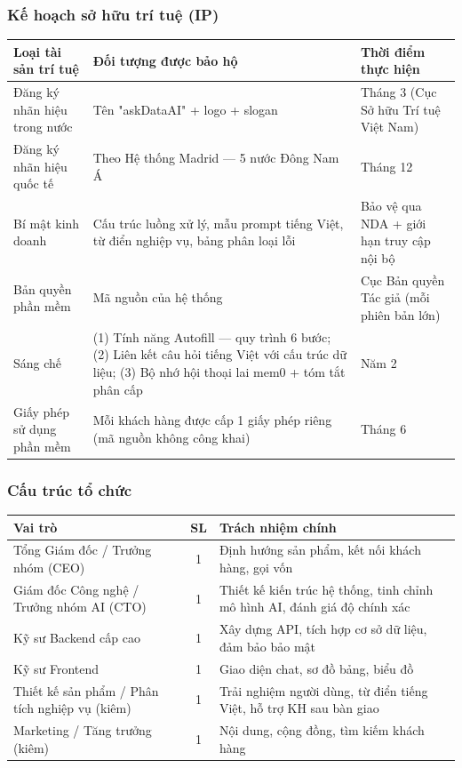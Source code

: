 \documentclass[11pt,a4paper]{article}
\begin{document}
\subsubsection{Kế hoạch sở hữu trí tuệ (IP)}

\begin{longtable}{|L{4cm}|L{6.5cm}|L{3.8cm}|}
\hline
{}\textbf{Loại tài sản trí tuệ} & \textbf{Đối tượng được bảo hộ} & \textbf{Thời điểm thực hiện} \\
\hline\endhead

Đăng ký nhãn hiệu trong nước & Tên "askDataAI" + logo + slogan & Tháng 3 (Cục Sở hữu Trí tuệ Việt Nam) \\ \hline
Đăng ký nhãn hiệu quốc tế & Theo Hệ thống Madrid --- 5 nước Đông Nam Á & Tháng 12 \\ \hline
Bí mật kinh doanh & Cấu trúc luồng xử lý, mẫu prompt tiếng Việt, từ điển nghiệp vụ, bảng phân loại lỗi & Bảo vệ qua NDA + giới hạn truy cập nội bộ \\ \hline
Bản quyền phần mềm & Mã nguồn của hệ thống & Cục Bản quyền Tác giả (mỗi phiên bản lớn) \\ \hline
Sáng chế & (1) Tính năng Autofill --- quy trình 6 bước; (2) Liên kết câu hỏi tiếng Việt với cấu trúc dữ liệu; (3) Bộ nhớ hội thoại lai mem0 + tóm tắt phân cấp & Năm 2 \\ \hline
Giấy phép sử dụng phần mềm & Mỗi khách hàng được cấp 1 giấy phép riêng (mã nguồn không công khai) & Tháng 6 \\ \hline

\end{longtable}

\subsubsection{Cấu trúc tổ chức}

\begin{center}
\begin{tabular}{|L{4cm}|c|L{8cm}|}
\hline
{}\textbf{Vai trò} & \textbf{SL} & \textbf{Trách nhiệm chính} \\
\hline
Tổng Giám đốc / Trưởng nhóm (CEO) & 1 & Định hướng sản phẩm, kết nối khách hàng, gọi vốn \\ \hline
Giám đốc Công nghệ / Trưởng nhóm AI (CTO) & 1 & Thiết kế kiến trúc hệ thống, tinh chỉnh mô hình AI, đánh giá độ chính xác \\ \hline
Kỹ sư Backend cấp cao & 1 & Xây dựng API, tích hợp cơ sở dữ liệu, đảm bảo bảo mật \\ \hline
Kỹ sư Frontend & 1 & Giao diện chat, sơ đồ bảng, biểu đồ \\ \hline
Thiết kế sản phẩm / Phân tích nghiệp vụ (kiêm) & 1 & Trải nghiệm người dùng, từ điển tiếng Việt, hỗ trợ KH sau bàn giao \\ \hline
Marketing / Tăng trưởng (kiêm) & 1 & Nội dung, cộng đồng, tìm kiếm khách hàng \\ \hline
\end{tabular}
\end{center}
\end{document}
